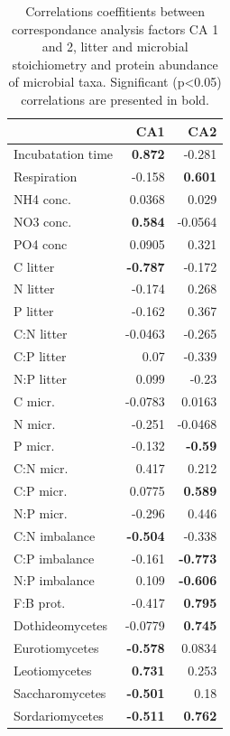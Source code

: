 \documentclass[10pt]{article}
\begin{document}
\begin{flushleft}
\begin{table}[h!]
\centering
\caption{Correlations coeffitients between correspondance analysis factors CA 1 and 2, litter and microbial stoichiometry and protein abundance of microbial taxa. Significant (p\textless 0.05) correlations are presented in bold.} 
\label{catab}
{\small
\begin{tabular}{lrr}
  \hline
 & CA1 & CA2 \\ 
  \hline
Incubatation time & \textbf{ 0.872 } & -0.281 \\ 
  Respiration & -0.158 & \textbf{ 0.601 } \\ 
  NH4 conc. & 0.0368 & 0.029 \\ 
  NO3 conc. & \textbf{ 0.584 } & -0.0564 \\ 
  PO4 conc & 0.0905 & 0.321 \\ 
  C litter & \textbf{ -0.787 } & -0.172 \\ 
  N litter & -0.174 & 0.268 \\ 
  P litter & -0.162 & 0.367 \\ 
  C:N litter & -0.0463 & -0.265 \\ 
  C:P litter & 0.07 & -0.339 \\ 
  N:P litter & 0.099 & -0.23 \\ 
  C micr. & -0.0783 & 0.0163 \\ 
  N micr. & -0.251 & -0.0468 \\ 
  P micr. & -0.132 & \textbf{ -0.59 } \\ 
  C:N micr. & 0.417 & 0.212 \\ 
  C:P micr. & 0.0775 & \textbf{ 0.589 } \\ 
  N:P micr. & -0.296 & 0.446 \\ 
  C:N imbalance & \textbf{ -0.504 } & -0.338 \\ 
  C:P imbalance & -0.161 & \textbf{ -0.773 } \\ 
  N:P imbalance & 0.109 & \textbf{ -0.606 } \\ 
  F:B prot. & -0.417 & \textbf{ 0.795 } \\ 
  Dothideomycetes & -0.0779 & \textbf{ 0.745 } \\ 
  Eurotiomycetes & \textbf{ -0.578 } & 0.0834 \\ 
  Leotiomycetes & \textbf{ 0.731 } & 0.253 \\ 
  Saccharomycetes & \textbf{ -0.501 } & 0.18 \\ 
  Sordariomycetes & \textbf{ -0.511 } & \textbf{ 0.762 } \\ 

\end{tabular}}
\end{table}
\end{flushleft}
\end{document}
